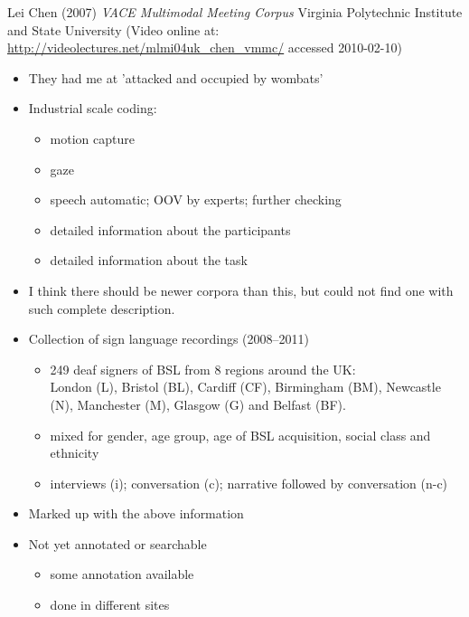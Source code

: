 \documentclass[a4paper,landscape,headrule,footrule,xetex]{foils}
\begin{document}


Lei Chen (2007) \textit{VACE Multimodal Meeting Corpus} Virginia
Polytechnic Institute and State University (Video online at:
\url{http://videolectures.net/mlmi04uk_chen_vmmc/} accessed
2010-02-10)


\begin{itemize}
\item They had me at 'attacked and occupied by wombats'
\item Industrial scale coding:
  \begin{itemize}
  \item motion capture
  \item gaze
  \item speech automatic; OOV by experts; further checking
  \item detailed information about the participants
  \item detailed information about the task
  \end{itemize}
\item I think there should be newer corpora than this, but could not
  find one with such complete description.

\end{itemize}



\begin{itemize}
\item Collection of sign language recordings (2008--2011)
  \begin{itemize}
  \item 249 deaf signers of BSL from 8 regions around the UK: 
    \\London (L), Bristol (BL), Cardiff (CF), Birmingham (BM), Newcastle (N), Manchester (M), Glasgow (G) and Belfast (BF).
  \item mixed for gender, age group, age of BSL acquisition, social class and ethnicity
  \item  interviews (i); conversation (c); narrative followed by conversation (n-c)
  \end{itemize}
\item Marked up with the above information
\item Not yet annotated or searchable
  \begin{itemize}
  \item some annotation available
  \item done in different sites
  \end{itemize}
\end{itemize}
\end{document}
